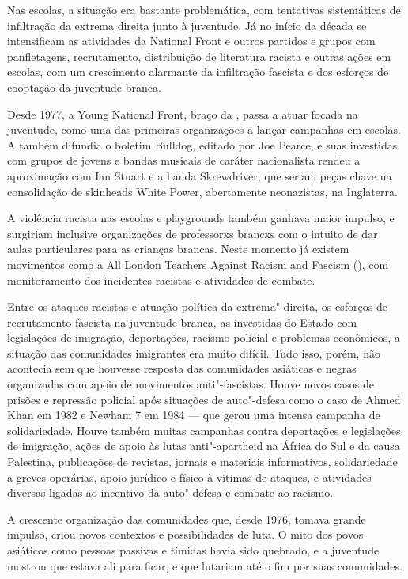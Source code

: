 Nas escolas, a situação era bastante problemática, com tentativas sistemáticas de infiltração da extrema direita junto à juventude. Já no início da década se intensificam as atividades da National Front e outros partidos e grupos com panfletagens, recrutamento, distribuição de literatura racista e outras ações em escolas, com um crescimento alarmante da infiltração fascista e dos esforços de cooptação da juventude branca.

Desde 1977, a Young National Front, braço da , passa a atuar focada na juventude, como uma das primeiras organizações a lançar campanhas em escolas. A  também difundia o boletim Bulldog, editado por Joe Pearce, e suas investidas com grupos de jovens e bandas musicais de caráter nacionalista rendeu a aproximação com Ian Stuart e a banda Skrewdriver, que seriam peças chave na consolidação de skinheads White Power, abertamente neonazistas, na Inglaterra.

A violência racista nas escolas e playgrounds também ganhava maior impulso, e surgiriam inclusive organizações de professorxs brancxs com o intuito de dar aulas particulares para as crianças brancas. Neste momento já existem movimentos como a All London Teachers Against Racism and Fascism (), com monitoramento dos incidentes racistas e atividades de combate.

Entre os ataques racistas e atuação política da extrema"-direita, os esforços de recrutamento fascista na juventude branca, as investidas do Estado com legislações de imigração, deportações, racismo policial e problemas econômicos, a situação das comunidades imigrantes era muito difícil. Tudo isso, porém, não acontecia sem que houvesse resposta das comunidades asiáticas e negras organizadas com apoio de movimentos anti"-fascistas. Houve novos casos de prisões e repressão policial após situações de auto"-defesa como o caso de Ahmed Khan em 1982 e Newham 7 em 1984 --- que gerou uma intensa campanha de solidariedade. Houve também muitas campanhas contra deportações e legislações de imigração, ações de apoio às lutas anti"-apartheid na África do Sul e da causa Palestina, publicações de revistas, jornais e materiais informativos, solidariedade a greves operárias, apoio jurídico e físico à vítimas de ataques, e atividades diversas ligadas ao incentivo da auto"-defesa e combate ao racismo.

 


A crescente organização das comunidades que, desde 1976, tomava grande impulso, criou novos contextos e possibilidades de luta. O mito dos povos asiáticos como pessoas passivas e tímidas havia sido quebrado, e a juventude mostrou que estava ali para ficar, e que lutariam até o fim por suas comunidades.

